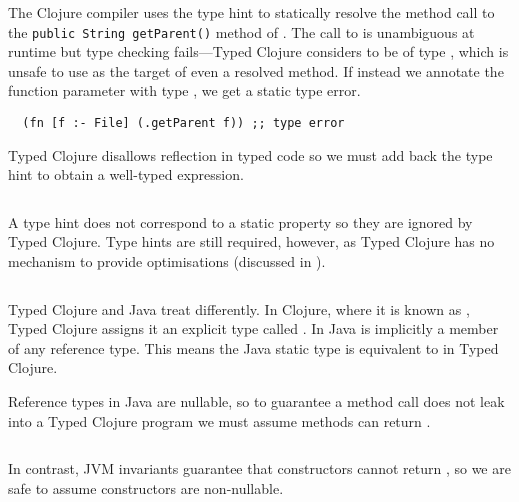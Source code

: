 The Clojure compiler uses the type hint
to statically resolve 
the method call to the
\texttt{public String getParent()}
method of .
The call to  is unambiguous at runtime but type 
checking fails---Typed Clojure
considers  to be of type , which is unsafe 
to use as the target of even a resolved method.
If instead we annotate the function parameter with type ,
we get a static type error.

\begin{verbatim}
  (fn [f :- File] (.getParent f)) ;; type error
\end{verbatim}

Typed Clojure disallows reflection in typed code
so we must add back the type hint to obtain a well-typed
expression.
\newpage
\begin{exmp}
\inputminted[firstline=10,lastline=10]{clojure}{code/demo/src/demo/parent3.clj}
\end{exmp}
A type hint does not correspond to a static property so they are ignored by Typed Clojure.
Type hints are still required, however, as Typed Clojure has no mechanism to provide
optimisations (discussed in ).

\begin{exmp}
\inputminted[firstline=18,lastline=19]{clojure}{code/demo/src/demo/parent3.clj}
\end{exmp}

Typed Clojure and Java treat  differently.
In Clojure, where it is known as , Typed Clojure assigns it an explicit type
called . In Java  is implicitly a member of any reference type.
This means the Java static type  is equivalent to
 in Typed Clojure.

Reference types in Java are nullable, so to guarantee a method call does not
leak  into a Typed Clojure program we
must assume methods can return .

\begin{exmp}
\inputminted[firstline=6,lastline=8]{clojure}{code/demo/src/demo/parent3.clj}
\end{exmp}

In contrast, JVM invariants guarantee that  constructors cannot return ,
so we are safe to assume constructors are non-nullable.

\begin{exmp}
\inputminted[firstline=15,lastline=16]{clojure}{code/demo/src/demo/parent3.clj}
\end{exmp}

